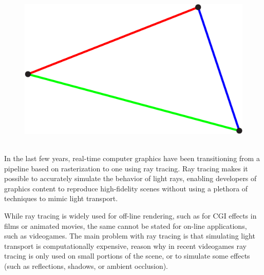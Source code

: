 \documentclass{PoliMi_MasterThesis}
\newcommand*\triangleLogo{
	\clearpage
	\thispagestyle{empty}
	\newpage
	\begin{figure}
		\centering
		\includegraphics[width=\textwidth]{Images/triangle_logo_thin.png} 
	\end{figure}
}
\begin{document}


\pagestyle{empty} %
\frontmatter %



\startpreamble
\triangleLogo
\setcounter{page}{1} %

\makeatletter
\let\savedchap\@makechapterhead
\def\@makechapterhead{\vspace*{-2cm}\savedchap}
\let\@makechapterhead\savedchap
\makeatletter

\vspace{-0.5cm}
\small
\\
In the last few years, real-time computer graphics have been transitioning from a pipeline based on rasterization to one using ray tracing.
Ray tracing makes it possible to accurately simulate the behavior of light rays, enabling developers of graphics content to reproduce high-fidelity scenes without using a plethora of techniques to mimic light transport.

While ray tracing is widely used for off-line rendering, such as for CGI effects in films or animated movies, the same cannot be stated for on-line applications, such as videogames. The main problem with ray tracing is that simulating light transport is computationally expensive, reason why in recent videogames ray tracing is only used on small portions of the scene, or to simulate some effects (such as reflections, shadows, or ambient occlusion).
\end{document}

